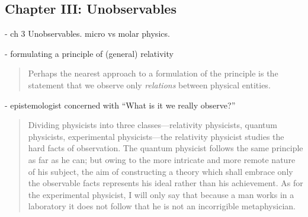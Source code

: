 \subsection{Chapter III: Unobservables}
- ch 3 Unobservables.  micro vs molar physics.

- formulating a principle of (general) relativity

\begin{quote}
    Perhaps the nearest approach to a formulation of the principle is the statement that we observe only \emph{relations} between physical entities.  \citep[p. 31]{Eddington1939}
\end{quote}


- epistemologist concerned with ``What is it we really observe?''

\begin{quote}
    Dividing physicists into three classes---relativity physicists, quantum physicists, experimental physicists---the relativity physicist studies the hard facts of observation.  The quantum  physicist follows the same principle as far as he can; but owing to the more intricate and more remote nature of his subject, the aim of constructing a theory which shall embrace only the observable facts represents his ideal rather than his achievement.  As for the experimental physicist, I will only say that because a man works in a laboratory it does not follow that he is not an incorrigible metaphysician.
    
    \citep[p. 32-33]{Eddington1939}
\end{quote}


